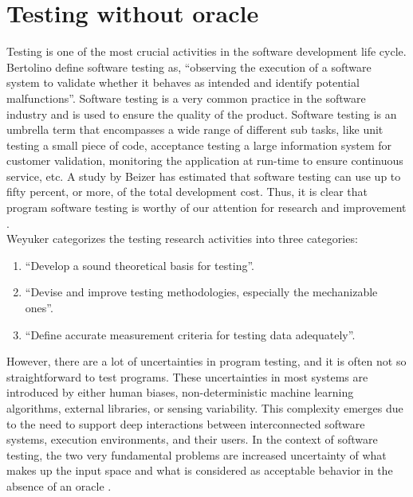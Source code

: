 




\section{Testing without oracle}
Testing is one of the most crucial activities in the software development life cycle. Bertolino \cite{Bertolino2007} define software testing as, \enquote{observing the execution of a software system to validate whether it behaves as intended and identify potential malfunctions}. Software testing is a very common practice in the software industry and is used to ensure the quality of the product. Software testing is an umbrella term that encompasses a wide range of different sub tasks, like unit testing a small piece of code, acceptance testing a large information system for customer validation, monitoring the application at run-time to ensure continuous service, etc.\cite{Bertolino2007} A study by Beizer \cite{Beizer1990} has estimated that software testing can use up to fifty percent, or more, of the total development cost. Thus, it is clear that program software testing is worthy of our attention for research and improvement \cite{Beizer1990}.\\
Weyuker \cite{Weyuker} categorizes the testing research activities into three categories:
\begin{enumerate}
  \item \enquote{Develop a sound theoretical basis for testing}.
  \item \enquote{Devise and improve testing methodologies, especially the mechanizable ones}.
  \item \enquote{Define accurate measurement criteria for testing data adequately}.
\end{enumerate}

However,  there are a lot of uncertainties in program testing, and it is often not so straightforward to test programs. These uncertainties in most systems are introduced by either human biases, non-deterministic machine learning algorithms, external libraries, or sensing variability. This complexity emerges due to the need to support deep interactions between interconnected software systems, execution environments, and their users. In the context of software testing, the two very fundamental problems are increased uncertainty of what makes up the input space and what is considered as acceptable behavior in the absence of an oracle \cite{Chen2002,Elbaum2014}.

